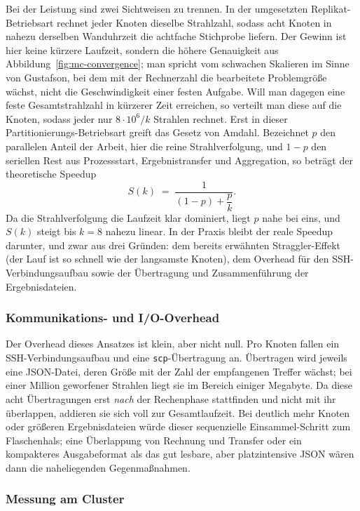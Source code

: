 Bei der Leistung sind zwei Sichtweisen zu trennen. In der umgesetzten
Replikat-Betriebsart rechnet jeder Knoten dieselbe Strahlzahl, sodass acht Knoten
in nahezu derselben Wanduhrzeit die achtfache Stichprobe liefern. Der Gewinn ist
hier keine kürzere Laufzeit, sondern die höhere Genauigkeit aus
Abbildung~\ref{fig:mc-convergence}; man spricht vom schwachen Skalieren im Sinne
von Gustafson, bei dem mit der Rechnerzahl die bearbeitete Problemgröße wächst,
nicht die Geschwindigkeit einer festen Aufgabe. Will man dagegen eine feste
Gesamtstrahlzahl in kürzerer Zeit erreichen, so verteilt man diese auf die Knoten,
sodass jeder nur $8\cdot10^{6}/k$ Strahlen rechnet. Erst in dieser
Partitionierungs-Betriebsart greift das Gesetz von Amdahl. Bezeichnet $p$ den parallelen
Anteil der Arbeit, hier die reine Strahlverfolgung, und $1-p$ den seriellen Rest
aus Prozessstart, Ergebnistransfer und Aggregation, so beträgt der theoretische
Speedup
\[
    S(k) \;=\; \frac{1}{(1-p) + \dfrac{p}{k}} .
\]
Da die Strahlverfolgung die Laufzeit klar dominiert, liegt $p$ nahe bei eins, und
$S(k)$ steigt bis $k=8$ nahezu linear. In der Praxis bleibt der reale Speedup
darunter, und zwar aus drei Gründen: dem bereits erwähnten Straggler-Effekt (der
Lauf ist so schnell wie der langsamste Knoten), dem Overhead für den
SSH-Verbindungsaufbau sowie der Übertragung und Zusammenführung der
Ergebnisdateien.

\subsubsection{Kommunikations- und I/O-Overhead}
\label{subsubsec:overhead}

Der Overhead dieses Ansatzes ist klein, aber nicht null. Pro Knoten fallen ein
SSH-Verbindungsaufbau und eine \texttt{scp}-Übertragung an. Übertragen wird jeweils
eine JSON-Datei, deren Größe mit der Zahl der empfangenen Treffer wächst; bei
einer Million geworfener Strahlen liegt sie im Bereich einiger Megabyte. Da diese
acht Übertragungen erst \emph{nach} der Rechenphase stattfinden und nicht mit ihr
überlappen, addieren sie sich voll zur Gesamtlaufzeit. Bei deutlich mehr Knoten
oder größeren Ergebnisdateien würde dieser sequenzielle Einsammel-Schritt zum
Flaschenhals; eine Überlappung von Rechnung und Transfer oder ein kompakteres
Ausgabeformat als das gut lesbare, aber platzintensive JSON wären dann die
naheliegenden Gegenmaßnahmen.

\subsubsection{Messung am Cluster}
\label{subsubsec:messung}

